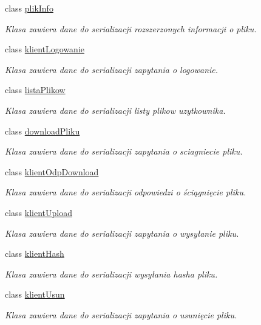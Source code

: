 \begin{CompactItemize}
class \hyperlink{a00018}{plikInfo}
\begin{CompactList}\small\item\em Klasa zawiera dane do serializacji rozszerzonych informacji o pliku. \item\end{CompactList}\item 
class \hyperlink{a00009}{klientLogowanie}
\begin{CompactList}\small\item\em Klasa zawiera dane do serializacji zapytania o logowanie. \item\end{CompactList}\item 
class \hyperlink{a00015}{listaPlikow}
\begin{CompactList}\small\item\em Klasa zawiera dane do serializacji listy plikow uzytkownika. \item\end{CompactList}\item 
class \hyperlink{a00002}{downloadPliku}
\begin{CompactList}\small\item\em Klasa zawiera dane do serializacji zapytania o sciagniecie pliku. \item\end{CompactList}\item 
class \hyperlink{a00010}{klientOdpDownload}
\begin{CompactList}\small\item\em Klasa zawiera dane do serializacji odpowiedzi o ściągnięcie pliku. \item\end{CompactList}\item 
class \hyperlink{a00011}{klientUpload}
\begin{CompactList}\small\item\em Klasa zawiera dane do serializacji zapytania o wysyłanie pliku. \item\end{CompactList}\item 
class \hyperlink{a00008}{klientHash}
\begin{CompactList}\small\item\em Klasa zawiera dane do serializacji wysyłania hasha pliku. \item\end{CompactList}\item 
class \hyperlink{a00012}{klientUsun}
\begin{CompactList}\small\item\em Klasa zawiera dane do serializacji zapytania o usunięcie pliku. \item\end{CompactList}\item 

\end{CompactItemize}
